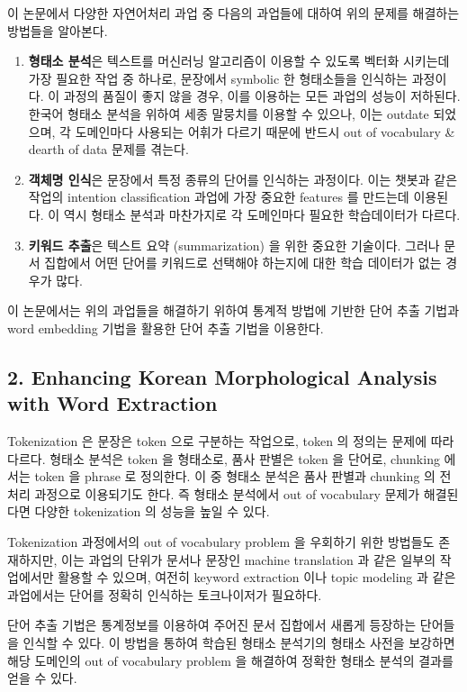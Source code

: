 \documentclass[11pt]{article}
\begin{document}
이 논문에서 다양한 자연어처리 과업 중 다음의 과업들에 대하여 위의 문제를 해결하는 방법들을 알아본다.

\begin{enumerate}
    \item \textbf{형태소 분석}은 텍스트를 머신러닝 알고리즘이 이용할 수 있도록 벡터화 시키는데 가장 필요한 작업 중 하나로, 문장에서 symbolic 한 형태소들을 인식하는 과정이다. 이 과정의 품질이 좋지 않을 경우, 이를 이용하는 모든 과업의 성능이 저하된다. 한국어 형태소 분석을 위하여 세종 말뭉치를 이용할 수 있으나, 이는 outdate 되었으며, 각 도메인마다 사용되는 어휘가 다르기 때문에 반드시 out of vocabulary \& dearth of data 문제를 겪는다.
    \item \textbf{객체명 인식}은 문장에서 특정 종류의 단어를 인식하는 과정이다. 이는 챗봇과 같은 작업의 intention classification 과업에 가장 중요한 features 를 만드는데 이용된다. 이 역시 형태소 분석과 마찬가지로 각 도메인마다 필요한 학습데이터가 다르다.
    \item \textbf{키워드 추출}은 텍스트 요약 (summarization) 을 위한 중요한 기술이다. 그러나 문서 집합에서 어떤 단어를 키워드로 선택해야 하는지에 대한 학습 데이터가 없는 경우가 많다.
\end{enumerate}

이 논문에서는 위의 과업들을 해결하기 위하여 통계적 방법에 기반한 단어 추출 기법과 word embedding 기법을 활용한 단어 추출 기법을 이용한다.

\subsection*{2. Enhancing Korean Morphological Analysis with Word Extraction}

Tokenization 은 문장은 token 으로 구분하는 작업으로, token 의 정의는 문제에 따라 다르다. 형태소 분석은 token 을 형태소로, 품사 판별은 token 을 단어로, chunking 에서는 token 을 phrase 로 정의한다. 이 중 형태소 분석은 품사 판별과 chunking 의 전처리 과정으로 이용되기도 한다. 즉 형태소 분석에서 out of vocabulary 문제가 해결된다면 다양한 tokenization 의 성능을 높일 수 있다.

Tokenization 과정에서의 out of vocabulary problem 을 우회하기 위한 방법들도 존재하지만, 이는 과업의 단위가 문서나 문장인 machine translation 과 같은 일부의 작업에서만 활용할 수 있으며, 여전히 keyword extraction 이나 topic modeling 과 같은 과업에서는 단어를 정확히 인식하는 토크나이저가 필요하다.

단어 추출 기법은 통계정보를 이용하여 주어진 문서 집합에서 새롭게 등장하는 단어들을 인식할 수 있다. 이 방법을 통하여 학습된 형태소 분석기의 형태소 사전을 보강하면 해당 도메인의 out of vocabulary problem 을 해결하여 정확한 형태소 분석의 결과를 얻을 수 있다.
\end{document}
